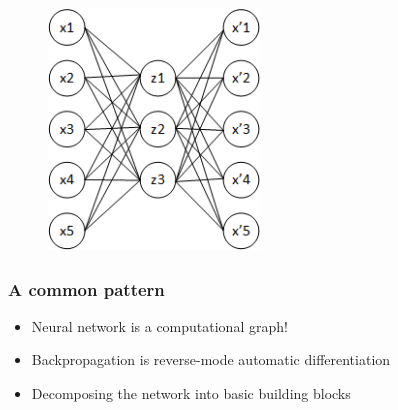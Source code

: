 \documentclass{beamer}
\begin{document}
\begin{frame}
\begin{figure}[h!]
	\centering
	\includegraphics[width=0.5\textwidth]{autoencoder_bad_diagram.png}
\end{figure}

\end{frame}
\begin{frame}
	\frametitle{A common pattern}
	\begin{itemize}
		\item Neural network is a computational graph!
		\item Backpropagation is reverse-mode automatic differentiation
		\item Decomposing the network into basic building blocks
	\end{itemize}
\end{frame}
\end{document}
